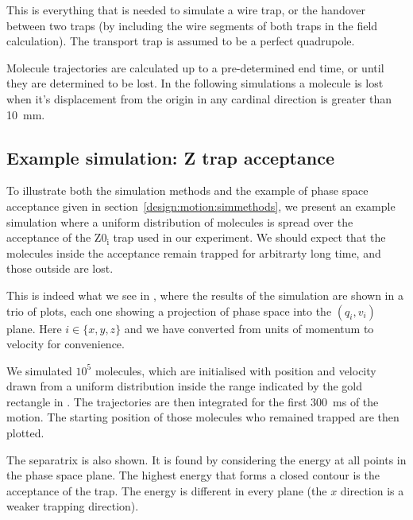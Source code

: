 This is everything that is needed to simulate a wire trap, or the handover
between two traps (by including the wire segments of both traps in the field
calculation). The transport trap is assumed to be a perfect quadrupole.

Molecule trajectories are calculated up to a pre-determined end time, or until
they are determined to be lost. In the following simulations a molecule is lost
when it's displacement from the origin in any cardinal direction is greater
than \SI{10}{\milli\meter}.

\subsection{Example simulation: Z trap acceptance}

To illustrate both the simulation methods and the example of phase space
acceptance given in section~\ref{design:motion:simmethods}, we present an
example simulation where a uniform distribution of molecules is spread over the
acceptance of the $\mathrm{Z0_i}$ trap used in our experiment. We should expect
that the molecules inside the acceptance remain trapped for arbitrarty long
time, and those outside are lost.

This is indeed what we see in , where the
results of the simulation are shown in a trio of plots, each one showing a
projection of phase space into the $(q_i, v_i)$ plane. Here $i\in\{x, y, z\}$
and we have converted from units of momentum to velocity for convenience. 

We simulated $10^5$ \CaF{} molecules, which are initialised with position and
velocity drawn from a uniform distribution inside the range indicated by the
gold rectangle in . The trajectories are then
integrated for the first \SI{300}{\milli\second} of the motion. The starting
position of those molecules who remained trapped are then plotted.

The separatrix is also shown. It is found by considering the energy at all
points in the phase space plane. The highest energy that forms a closed contour
is the acceptance of the trap. The energy is different in every plane (the $x$
direction is a weaker trapping direction).


